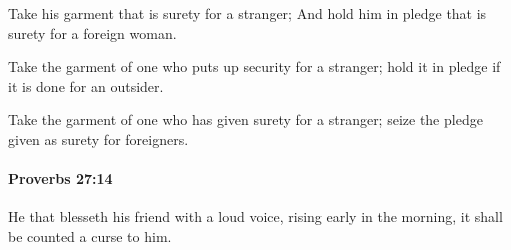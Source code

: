 			\begin{versebox}
					\item[BHS] 
					\item[ASV] Take his garment that is surety for a stranger; And hold him in pledge that is surety for a foreign woman.
					\item[NIV] Take the garment of one who puts up security for a stranger; hold it in pledge if it is done for an outsider.
					\item[NRSV] Take the garment of one who has given surety for a stranger; seize the pledge given as surety for foreigners.
			\end{versebox}

		\paragraph{Proverbs 27:14} %
			\label{PROVERBS-27-14}

			He that blesseth his friend with a loud voice, rising early in the morning, it shall be counted a curse to him.

